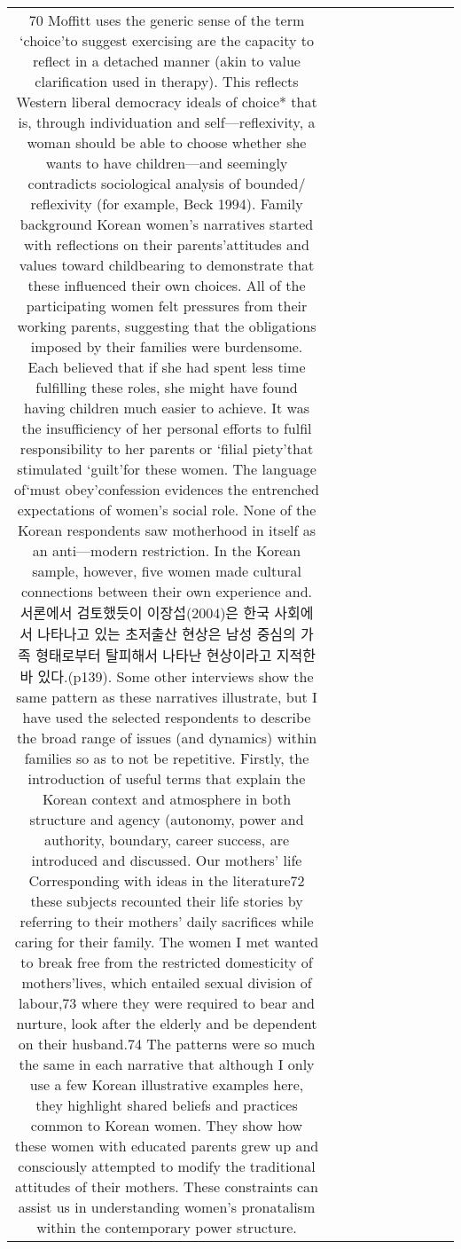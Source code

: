 \begin{table}[h!]
\begin{tabular}{|c|c|c|c|c|c|c|c|c|c|}
{70 Moffitt uses the generic sense of the term ‘choice’to suggest exercising are the capacity to reflect in a detached manner (akin to value clarification used in therapy). This reflects Western liberal democracy ideals of choice* that is, through individuation and self—reflexivity, a woman should be able to choose whether she wants to have children—and seemingly contradicts sociological analysis of bounded/ reflexivity (for example, Beck 1994).
Family background
Korean women's narratives started with reflections on their parents’attitudes and values toward childbearing to demonstrate that these influenced their own choices. All of the participating women felt pressures from their working parents, suggesting that the obligations imposed by their families were burdensome. Each believed that if she had spent less time fulfilling these roles, she might have found having children much easier to achieve. It was the insufficiency of her personal efforts to fulfil responsibility to her parents or ‘filial piety’that stimulated ‘guilt’for these women. The language of‘must obey’confession evidences the entrenched expectations of women’s social role.
None of the Korean respondents saw motherhood in itself as an anti—modern restriction. In the Korean sample, however, five women made cultural connections between their own experience and. 서론에서 검토했듯이 이장섭(2004)은 한국 사회에서 나타나고 있는 초저출산 현상은 남성 중심의 가족 형태로부터 탈피해서 나타난 현상이라고 지적한바 있다.(p139).
Some other interviews show the same pattern as these narratives illustrate, but I have used the selected respondents to describe the broad range of issues (and dynamics) within families so as to not be repetitive.
Firstly, the introduction of useful terms that explain the Korean context and atmosphere in both structure and agency (autonomy, power and authority, boundary, career success, are introduced and discussed.
Our mothers’ life Corresponding with ideas in the literature72 these subjects recounted their life stories by referring to their mothers' daily sacrifices while caring for their family. The women I met wanted to break free from the restricted domesticity of mothers’lives, which entailed sexual division of labour,73 where they were required to bear and nurture, look after the elderly and be dependent on their husband.74 The patterns were so much the same in each narrative that although I only use a few Korean illustrative examples here, they highlight shared beliefs and practices common to Korean women. They show how these women with educated parents grew up and consciously attempted to modify the traditional attitudes of their mothers. These constraints can assist us in understanding women’s pronatalism within the contemporary power structure.
}
\end{tabular}
\end{table}
